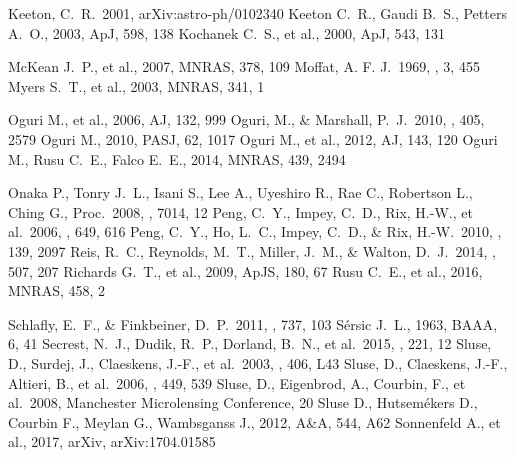 \documentclass[manuscript]{aastex}
\begin{document}
\begin{thebibliography}{}
 Keeton, C.~R.\ 2001, arXiv:astro-ph/0102340 
 Keeton C.~R., Gaudi B.~S., Petters A.~O., 2003, ApJ, 598, 138 
 Kochanek C.~S., et al., 2000, ApJ, 543, 131 

 McKean J.~P., et al., 2007, MNRAS, 378, 109 
 Moffat, A. F. J.\ 1969, \aap, 3, 455
 Myers S.~T., et al., 2003, MNRAS, 341, 1 

 Oguri M., et al., 2006, AJ, 132, 999
 Oguri, M., \& Marshall, P.~J.\ 2010, \mnras, 405, 2579 
 Oguri M., 2010, PASJ, 62, 1017 
 Oguri M., et al., 2012, AJ, 143, 120
 Oguri M., Rusu C.~E., Falco E.~E., 2014, MNRAS, 439, 2494

 Onaka P., Tonry J.~L., Isani S., Lee A., Uyeshiro R., Rae C., Robertson L., Ching G., Proc.\ 2008, \procspie, 7014, 12
 Peng, C.~Y., Impey, C.~D., Rix, H.-W., et al.\ 2006, \apj, 649, 616 
 Peng, C.~Y., Ho, L.~C., Impey, C.~D., \& Rix, H.-W.\ 2010, \aj, 139, 2097 
 Reis, R.~C., Reynolds, M.~T., Miller, J.~M., \& Walton, D.~J.\ 2014, \nat, 507, 207 
 Richards G.~T., et al., 2009, ApJS, 180, 67 
 Rusu C.~E., et al., 2016, MNRAS, 458, 2

 Schlafly, E.~F., \& Finkbeiner, D.~P.\ 2011, \apj, 737, 103 
 S{\'e}rsic J.~L., 1963, BAAA, 6, 41 
 Secrest, N.~J., Dudik, R.~P., Dorland, B.~N., et al.\ 2015, \apjs, 221, 12 
 Sluse, D., Surdej, J., Claeskens, J.-F., et al.\ 2003, \aap, 406, L43 
 Sluse, D., Claeskens, J.-F., Altieri, B., et al.\ 2006, \aap, 449, 539 
 Sluse, D., Eigenbrod, A., Courbin, F., et al.\ 2008, Manchester Microlensing Conference, 20 
 Sluse D., Hutsem{\'e}kers D., Courbin F., Meylan G., Wambsganss J., 2012, A\&A, 544, A62
 Sonnenfeld A., et al., 2017, arXiv, arXiv:1704.01585 


\end{thebibliography}
\end{document}
